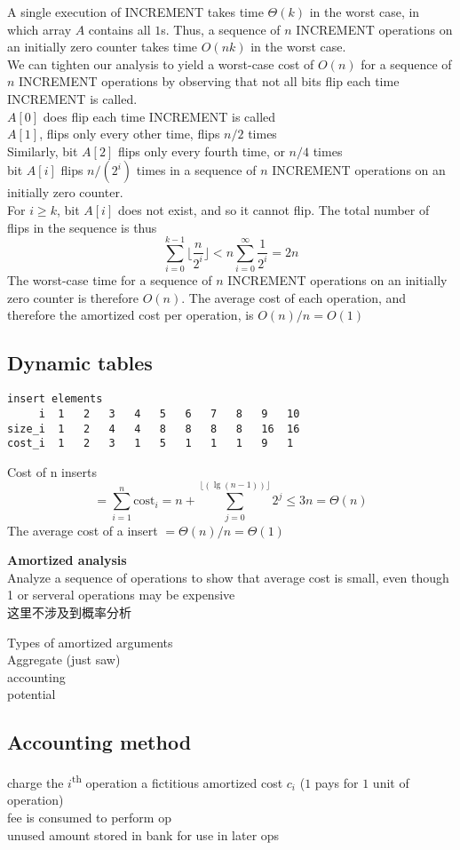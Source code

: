 \documentclass{article}
\begin{document}
A single execution of INCREMENT takes time $\Theta(k)$ in the worst case, in which array $A$ contains all $1$s. Thus, a sequence of $n$ INCREMENT operations on an initially zero counter takes time $O(nk)$ in the worst case.\\
We can tighten our analysis to yield a worst-case cost of $O(n)$ for a sequence of $n$ INCREMENT operations by observing that not all bits flip each time INCREMENT is called.\\
$A[0]$ does flip each time INCREMENT is called\\
$A[1]$, flips only every other time, flips $n/2$ times\\
Similarly, bit $A[2]$ flips only every fourth time, or $n/4$ times\\
bit $A[i]$ flips $n/(2^i)$ times in a sequence of $n$ INCREMENT operations on an initially zero counter.\\
For $i \geq k$, bit $A[i]$ does not exist, and so it cannot flip. The total number of flips in the sequence is thus
$$
\sum_{i=0}^{k-1}\lfloor \frac{n}{2^i} \rfloor
< n \sum_{i=0}^{\infty} \frac{1}{2^i}
= 2n
$$
The worst-case time for a sequence of $n$ INCREMENT operations on an initially zero counter is therefore $O(n)$. The average cost of each operation, and therefore the amortized cost per operation, is $O(n)/n = O(1)$
\subsection{Dynamic tables}
\begin{verbatim}
insert elements
     i	1	2	3	4	5	6	7	8	9 	10
size_i	1	2	4	4	8	8	8	8	16	16
cost_i	1	2	3	1	5	1	1	1	9 	1
\end{verbatim}

Cost of n inserts
$$
=\sum_{i=1}^n \mbox{cost}_i
=n+\sum_{j=0}^{\lfloor (\lg (n-1))\rfloor } 2^j
\leq 3n = \Theta(n)
$$
The average cost of a insert $= \Theta(n)/n=\Theta(1)$

\textbf{Amortized analysis}\\
Analyze a sequence of operations to show that average cost is small, even though 1 or serveral operations may be expensive\\
这里不涉及到概率分析

Types of amortized arguments\\
Aggregate (just saw)\\
accounting\\
potential

\subsection{Accounting method}
charge the $i$\textsuperscript{th} operation a fictitious amortized cost $c_i$ ($1$ pays for $1$ unit of operation)\\
fee is consumed to perform op\\
unused amount stored in bank for use in later ops
\end{document}
